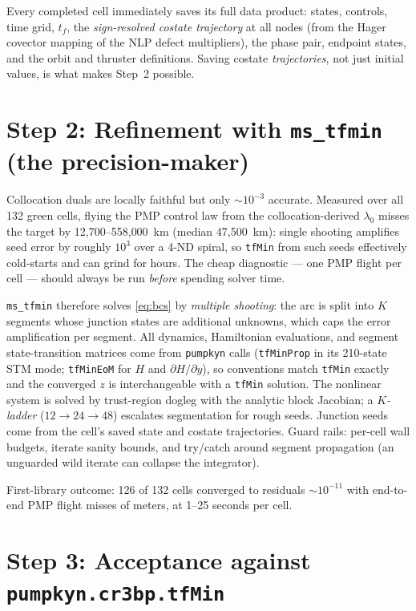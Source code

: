 \documentclass[11pt]{article}
\begin{document}
Every completed cell immediately saves its full data product: states,
controls, time grid, $t_f$, the \emph{sign-resolved costate trajectory} at all
nodes (from the Hager covector mapping of the NLP defect multipliers), the
phase pair, endpoint states, and the orbit and thruster definitions. Saving
costate \emph{trajectories}, not just initial values, is what makes Step~2
possible.

\section{Step 2: Refinement with \texttt{ms\_tfmin} (the precision-maker)}

Collocation duals are locally faithful but only ${\sim}10^{-3}$ accurate.
Measured over all 132 green cells, flying the PMP control law from the
collocation-derived $\lambda_0$ misses the target by 12{,}700--558{,}000~km
(median 47{,}500~km): single shooting amplifies seed error by roughly
$10^{3}$ over a 4-ND spiral, so \texttt{tfMin} from such seeds effectively
cold-starts and can grind for hours. The cheap diagnostic --- one PMP flight
per cell --- should always be run \emph{before} spending solver time.

\texttt{ms\_tfmin} therefore solves \eqref{eq:bcs} by \emph{multiple
shooting}: the arc is split into $K$ segments whose junction states are
additional unknowns, which caps the error amplification per segment. All
dynamics, Hamiltonian evaluations, and segment state-transition matrices come
from \texttt{pumpkyn} calls (\texttt{tfMinProp} in its 210-state STM mode;
\texttt{tfMinEoM} for $H$ and $\partial H/\partial y$), so conventions match
\texttt{tfMin} exactly and the converged $z$ is interchangeable with a
\texttt{tfMin} solution. The nonlinear system is solved by trust-region
dogleg with the analytic block Jacobian; a \emph{$K$-ladder} ($12 \to 24 \to
48$) escalates segmentation for rough seeds. Junction seeds come from the
cell's saved state and costate trajectories. Guard rails: per-cell wall
budgets, iterate sanity bounds, and try/catch around segment propagation
(an unguarded wild iterate can collapse the integrator).

First-library outcome: 126 of 132 cells converged to residuals
${\sim}10^{-11}$ with end-to-end PMP flight misses of meters, at 1--25
seconds per cell.

\section{Step 3: Acceptance against \texttt{pumpkyn.cr3bp.tfMin}}
\end{document}
